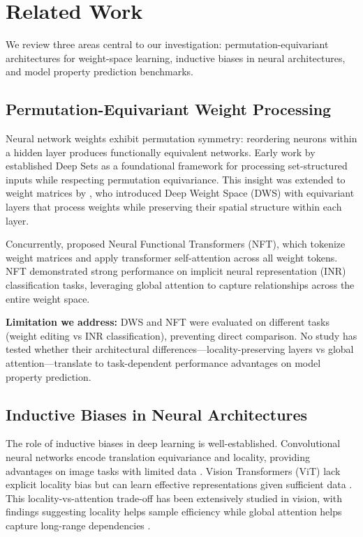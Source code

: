 \section{Related Work}

We review three areas central to our investigation: permutation-equivariant architectures for weight-space learning, inductive biases in neural architectures, and model property prediction benchmarks.

\subsection{Permutation-Equivariant Weight Processing}

Neural network weights exhibit permutation symmetry: reordering neurons within a hidden layer produces functionally equivalent networks. Early work by \citet{zaheer2017deepsets} established Deep Sets as a foundational framework for processing set-structured inputs while respecting permutation equivariance. This insight was extended to weight matrices by \citet{navon2023dws}, who introduced Deep Weight Space (DWS) with equivariant layers that process weights while preserving their spatial structure within each layer.

Concurrently, \citet{zhou2024nft} proposed Neural Functional Transformers (NFT), which tokenize weight matrices and apply transformer self-attention across all weight tokens. NFT demonstrated strong performance on implicit neural representation (INR) classification tasks, leveraging global attention to capture relationships across the entire weight space.

\textbf{Limitation we address:} DWS and NFT were evaluated on different tasks (weight editing vs INR classification), preventing direct comparison. No study has tested whether their architectural differences---locality-preserving layers vs global attention---translate to task-dependent performance advantages on model property prediction.

\subsection{Inductive Biases in Neural Architectures}

The role of inductive biases in deep learning is well-established. Convolutional neural networks encode translation equivariance and locality, providing advantages on image tasks with limited data \cite{lecun1998gradient}. Vision Transformers (ViT) lack explicit locality bias but can learn effective representations given sufficient data \cite{dosovitskiy2020vit}. This locality-vs-attention trade-off has been extensively studied in vision, with findings suggesting locality helps sample efficiency while global attention helps capture long-range dependencies \cite{chen2021vit}.

